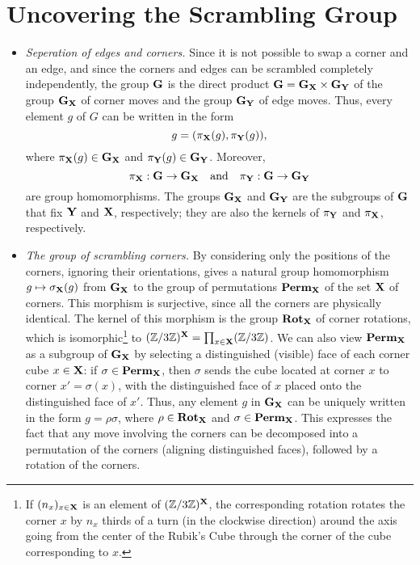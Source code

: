 \section{Uncovering the Scrambling Group}

\begin{itemize}
    \item \emph{Seperation of edges and corners.} Since it is not possible to swap a corner and an edge, and since the corners and edges can be scrambled completely independently, the group $\mathbf{G}$ is the direct product $\mathbf{G} = \mathbf{G}_{\mathbf{X}} \times \mathbf{G}_{\mathbf{Y}}$ of the group $\mathbf{G}_{\mathbf{X}}$ of corner moves and the group $\mathbf{G}_{\mathbf{Y}}$ of edge moves. Thus, every element $g$ of $G$ can be written in the form
    $$
    g = (\pi_{\mathbf{X}}(g), \pi_{\mathbf{Y}}(g)),
    $$
    where $\pi_{\mathbf{X}}(g) \in \mathbf{G}_{\mathbf{X}}$ and $\pi_{\mathbf{Y}}(g) \in \mathbf{G}_{\mathbf{Y}}$. Moreover,
    $$
    \pi_{\mathbf{X}} : \mathbf{G} \to \mathbf{G}_{\mathbf{X}} \quad \text{and} \quad \pi_{\mathbf{Y}} : \mathbf{G} \to \mathbf{G}_{\mathbf{Y}}
    $$
    are group homomorphisms.
    The groups $\mathbf{G}_{\mathbf{X}}$ and $\mathbf{G}_{\mathbf{Y}}$ are the subgroups of $\mathbf{G}$ that fix $\mathbf{Y}$ and $\mathbf{X}$, respectively; they are also the kernels of $\pi_{\mathbf{Y}}$ and $\pi_{\mathbf{X}}$, respectively.

    \item \emph{The group of scrambling corners.} By considering only the positions of the corners, ignoring their orientations, gives a natural group homomorphism $g \mapsto \sigma_{\mathbf{X}}(g)$ from $\mathbf{G}_{\mathbf{X}}$ to the group of permutations $\mathbf{Perm}_{\mathbf{X}}$ of the set $\mathbf{X}$ of corners. This morphism is surjective, since all the corners are physically identical. The kernel of this morphism is the group $\mathbf{Rot}_{\mathbf{X}}$ of corner rotations, which is isomorphic\footnote{If $(n_x)_{x \in \mathbf{X}}$ is an element of $(\mathbb{Z}/3\mathbb{Z})^{\mathbf{X}}$, the corresponding rotation rotates the corner $x$ by $n_x$ thirds of a turn (in the clockwise direction) around the axis going from the center of the Rubik's Cube through the corner of the cube corresponding to $x$.} to $(\mathbb{Z}/3\mathbb{Z})^{\mathbf{X}} = \prod_{x \in \mathbf{X}} (\mathbb{Z}/3\mathbb{Z})$.
    We can also view $\mathbf{Perm}_{\mathbf{X}}$ as a subgroup of $\mathbf{G}_{\mathbf{X}}$ by selecting a distinguished (visible) face of each corner cube $x \in \mathbf{X}$: if $\sigma \in \mathbf{Perm}_{\mathbf{X}}$, then $\sigma$ sends the cube located at corner $x$ to corner $x' = \sigma(x)$, with the distinguished face of $x$ placed onto the distinguished face of $x'$.
    Thus, any element $g$ in $\mathbf{G}_{\mathbf{X}}$ can be uniquely written in the form $g = \rho \sigma$, where $\rho \in \mathbf{Rot}_{\mathbf{X}}$ and $\sigma \in \mathbf{Perm}_{\mathbf{X}}$. This expresses the fact that any move involving the corners can be decomposed into a permutation of the corners (aligning distinguished faces), followed by a rotation of the corners.


\end{itemize}
